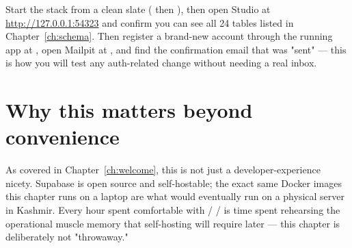 \begin{olktask}
Start the stack from a clean slate ( then ), then open Studio at \url{http://127.0.0.1:54323} and confirm you can see all 24 tables listed in Chapter~\ref{ch:schema}. Then register a brand-new account through the running app at , open Mailpit at , and find the confirmation email that was "sent" — this is how you will test any auth-related change without needing a real inbox.
\end{olktask}

\section{Why this matters beyond convenience}

As covered in Chapter~\ref{ch:welcome}, this is not just a developer-experience nicety. Supabase is open source and self-hostable; the exact same Docker images this chapter runs on a laptop are what would eventually run on a physical server in Kashmir. Every hour spent comfortable with  /  /  is time spent rehearsing the operational muscle memory that self-hosting will require later — this chapter is deliberately not "throwaway."
